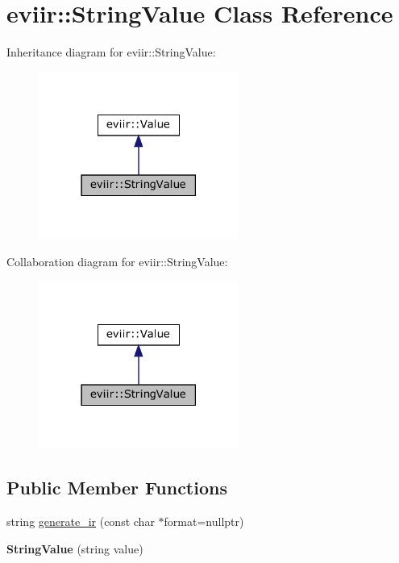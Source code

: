 \hypertarget{classeviir_1_1StringValue}{}\section{eviir\+:\+:String\+Value Class Reference}
\label{classeviir_1_1StringValue}


Inheritance diagram for eviir\+:\+:String\+Value\+:\nopagebreak
\begin{figure}[H]
\begin{center}
\leavevmode
\includegraphics[width=186pt]{classeviir_1_1StringValue__inherit__graph}
\end{center}
\end{figure}


Collaboration diagram for eviir\+:\+:String\+Value\+:\nopagebreak
\begin{figure}[H]
\begin{center}
\leavevmode
\includegraphics[width=186pt]{classeviir_1_1StringValue__coll__graph}
\end{center}
\end{figure}
\subsection*{Public Member Functions}
\begin{DoxyCompactItemize}
\item 
string \hyperlink{classeviir_1_1StringValue_ab8c17f9426e993cd01bd67958aba0038}{generate\+\_\+ir} (const char $\ast$format=nullptr)
\item 
\mbox{\label{classeviir_1_1StringValue_a53a941b534b65d2d0ac1a3737f5cb678}} 
{\bfseries String\+Value} (string value)
\end{DoxyCompactItemize}
